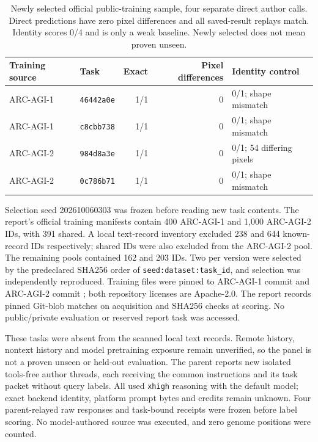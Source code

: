 \documentclass[11pt]{article}
\begin{document}
\begin{table}[!htbp]
\centering\small
\begin{tabular}{@{}llrrl@{}}
\toprule
Training source & Task & Exact & Pixel differences & Identity control\\
\midrule
ARC-AGI-1 & \texttt{46442a0e} & 1/1 & 0 & 0/1; shape mismatch\\
ARC-AGI-1 & \texttt{c8cbb738} & 1/1 & 0 & 0/1; shape mismatch\\
ARC-AGI-2 & \texttt{984d8a3e} & 1/1 & 0 & 0/1; 54 differing pixels\\
ARC-AGI-2 & \texttt{0c786b71} & 1/1 & 0 & 0/1; shape mismatch\\
\bottomrule
\end{tabular}
\caption{Newly selected official public-training sample, four separate direct author calls.
Direct predictions have zero pixel differences and all saved-result replays match. Identity
scores 0/4 and is only a weak baseline. Newly selected does not mean proven unseen.}
\label{tab:directarcnew}
\end{table}

Selection seed 202610060303 was frozen before reading new task contents. The report's official
training manifests contain 400 ARC-AGI-1 and 1{,}000 ARC-AGI-2 IDs, with 391 shared. A local
text-record inventory excluded 238 and 644 known-record IDs respectively; shared IDs were
also excluded from the ARC-AGI-2 pool. The remaining pools contained 162 and 203 IDs.
Two per version were selected by the predeclared SHA256 order of \texttt{seed:dataset:task\_id}, and selection was independently
reproduced. Training files were pinned to ARC-AGI-1 commit
 and ARC-AGI-2 commit
; both repository licenses are Apache-2.0.
The report records pinned Git-blob matches on acquisition and SHA256 checks at scoring.
No public/private evaluation or reserved report task was accessed.

These tasks were absent from the scanned local text records. Remote history, nontext history
and model pretraining exposure remain unverified, so the panel is not a proven unseen or
held-out evaluation. The parent reports new isolated tools-free author threads, each receiving
the common instructions and its task packet without query labels. All used \texttt{xhigh}
reasoning with the default model; exact backend identity, platform prompt bytes and credits
remain unknown. Four parent-relayed raw responses and task-bound receipts were frozen before
label scoring. No model-authored source was executed, and zero genome positions were counted.
\end{document}

